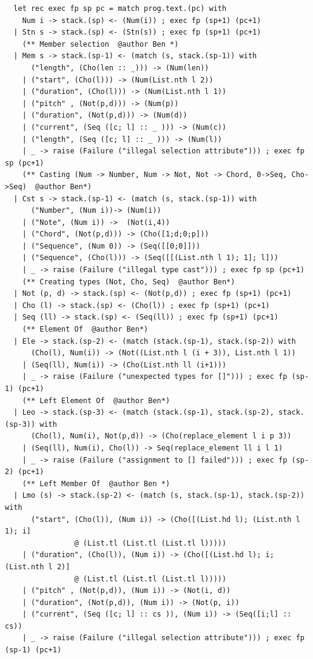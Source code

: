 \documentclass[12pt,A4]{book}
\begin{document}
\begin{verbatim}
  let rec exec fp sp pc = match prog.text.(pc) with
    Num i -> stack.(sp) <- (Num(i)) ; exec fp (sp+1) (pc+1)
  | Stn s -> stack.(sp) <- (Stn(s)) ; exec fp (sp+1) (pc+1)
    (** Member selection  @author Ben *)
  | Mem s -> stack.(sp-1) <- (match (s, stack.(sp-1)) with 
      ("length", (Cho(len :: _))) -> (Num(len))
    | ("start", (Cho(l))) -> (Num(List.nth l 2))
    | ("duration", (Cho(l))) -> (Num(List.nth l 1))
    | ("pitch" , (Not(p,d))) -> (Num(p))
    | ("duration", (Not(p,d))) -> (Num(d))
    | ("current", (Seq ([c; l] :: _ ))) -> (Num(c))
    | ("length", (Seq ([c; l] :: _ ))) -> (Num(l))
    | _ -> raise (Failure ("illegal selection attribute"))) ; exec fp sp (pc+1)
    (** Casting (Num -> Number, Num -> Not, Not -> Chord, 0->Seq, Cho->Seq)  @author Ben*)
  | Cst s -> stack.(sp-1) <- (match (s, stack.(sp-1)) with 
      ("Number", (Num i))-> (Num(i))
    | ("Note", (Num i)) ->  (Not(i,4))
    | ("Chord", (Not(p,d))) -> (Cho([1;d;0;p]))
    | ("Sequence", (Num 0)) -> (Seq([[0;0]]))
    | ("Sequence", (Cho(l))) -> (Seq([[(List.nth l 1); 1]; l]))
    | _ -> raise (Failure ("illegal type cast"))) ; exec fp sp (pc+1)
    (** Creating types (Not, Cho, Seq)  @author Ben*)
  | Not (p, d) -> stack.(sp) <- (Not(p,d)) ; exec fp (sp+1) (pc+1)
  | Cho (l) -> stack.(sp) <- (Cho(l)) ; exec fp (sp+1) (pc+1)
  | Seq (ll) -> stack.(sp) <- (Seq(ll)) ; exec fp (sp+1) (pc+1)
    (** Element Of  @author Ben*)
  | Ele -> stack.(sp-2) <- (match (stack.(sp-1), stack.(sp-2)) with 
      (Cho(l), Num(i)) -> (Not((List.nth l (i + 3)), List.nth l 1))
    | (Seq(ll), Num(i)) -> (Cho(List.nth ll (i+1)))
    | _ -> raise (Failure ("unexpected types for []"))) ; exec fp (sp-1) (pc+1)
    (** Left Element Of  @author Ben*)
  | Leo -> stack.(sp-3) <- (match (stack.(sp-1), stack.(sp-2), stack.(sp-3)) with 
      (Cho(l), Num(i), Not(p,d)) -> (Cho(replace_element l i p 3))
    | (Seq(ll), Num(i), Cho(l)) -> Seq(replace_element ll i l 1)
    | _ -> raise (Failure ("assignment to [] failed"))) ; exec fp (sp-2) (pc+1)
    (** Left Member Of  @author Ben *)
  | Lmo (s) -> stack.(sp-2) <- (match (s, stack.(sp-1), stack.(sp-2)) with 
      ("start", (Cho(l)), (Num i)) -> (Cho([(List.hd l); (List.nth l 1); i] 
                @ (List.tl (List.tl (List.tl l)))))
    | ("duration", (Cho(l)), (Num i)) -> (Cho([(List.hd l); i; (List.nth l 2)] 
                @ (List.tl (List.tl (List.tl l)))))
    | ("pitch" , (Not(p,d)), (Num i)) -> (Not(i, d))
    | ("duration", (Not(p,d)), (Num i)) -> (Not(p, i))
    | ("current", (Seq ([c; l] :: cs )), (Num i)) -> (Seq([i;l] :: cs))
    | _ -> raise (Failure ("illegal selection attribute"))) ; exec fp (sp-1) (pc+1)

\end{verbatim}
\end{document}

